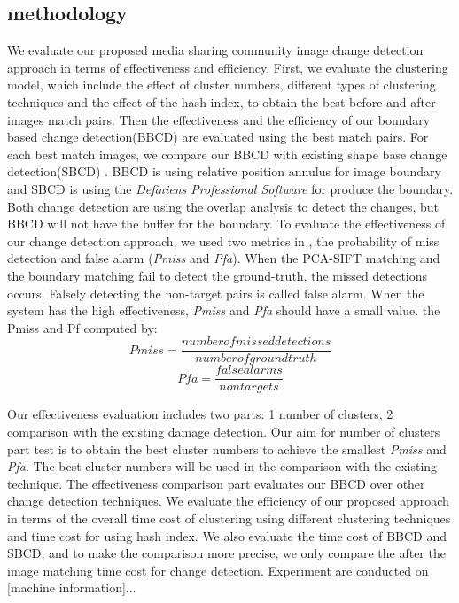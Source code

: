 \documentclass[runningheads,a4paper]{llncs}
\begin{document}
\subsection{methodology}
We evaluate our proposed media sharing community image change detection approach in terms of effectiveness and efficiency. First, we evaluate the clustering model, which include the effect of cluster numbers, different types of clustering techniques and the effect of the hash index, to obtain the best before and after images match pairs. Then the effectiveness and the efficiency of our boundary based change detection(BBCD) are evaluated using the best match pairs.  
For each best match images, we compare our BBCD with existing shape base change detection(SBCD) \cite{rs2051217}. 
BBCD is using relative position annulus for image boundary and SBCD is using the \textit{Definiens Professional Software} for produce the boundary. 
Both change detection are using the overlap analysis to detect the changes, but BBCD will not have the buffer for the boundary. 
To evaluate the effectiveness of our change detection approach, we used two metrics in \cite{Zhou:2014:EDO:2628707.2628786}, the probability of miss detection and false alarm (\textit{Pmiss} and \textit{Pfa}). When the PCA-SIFT matching and the boundary matching fail to detect the ground-truth, the missed detections occurs. Falsely detecting the non-target pairs is called false alarm. When the system has the high effectiveness, \textit{Pmiss} and \textit{Pfa} should have a small value. the Pmiss and Pf computed by:  
\begin{equation}
Pmiss = \frac{number of missed detections}{number of ground truth}
\end{equation} 
\begin{equation}
Pfa = \frac{false alarms}{non targets }
\end{equation} 

Our effectiveness evaluation includes two parts: 1 number of clusters, 2 comparison with the existing damage detection. Our aim for number of clusters part test is to obtain the best cluster numbers to achieve the smallest \textit{Pmiss} and \textit{Pfa}. The best cluster numbers will be used in the comparison with the existing technique. The effectiveness comparison part evaluates our BBCD over other change detection techniques.
We evaluate the efficiency of our proposed approach in terms of the overall time cost of clustering using different clustering techniques and time cost for using hash index. We also evaluate the time cost of BBCD and SBCD, and to make the comparison more precise, we only compare the after the image matching time cost for change detection. 
Experiment are conducted on [machine information]...
\end{document}

